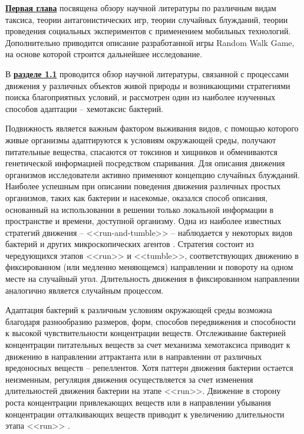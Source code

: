 \underline{\textbf{Первая глава}} посвящена обзору научной литературы по различным видам таксиса, теории антагонистических игр, теории случайных блужданий, теории проведения социальных экспериментов с применением мобильных технологий. Дополнительно приводится описание разработанной игры Random Walk Game, на основе которой строится дальнейшее исследование.

В \underline{\textbf{разделе 1.1}} проводится обзор научной литературы, связанной с процессами движения у различных объектов живой природы и возникающими стратегиями поиска благоприятных условий, и рассмотрен один из наиболее изученных способов адаптации -- хемотаксис бактерий. 

Подвижность является важным фактором выживания видов, с помощью которого живые организмы адаптируются к условиям окружающей среды, получают питательные вещества, спасаются от токсинов и хищников и обмениваются генетической информацией посредством спаривания. Для описания движения организмов исследователи активно применяют концепцию случайных блужданий. Наиболее успешным при описании поведения движения различных простых организмов, таких как бактерии и насекомые, оказался способ описания, основанный на использовании в решении только локальной информации в пространстве и времени, доступной организму. Одна из наиболее известных стратегий движения -- <<run-and-tumble>> -- наблюдается у некоторых видов бактерий и других микроскопических агентов \cite{berg_coli_2004}. Стратегия состоит из чередующихся этапов <<run>> и <<tumble>>, соответствующих движению в фиксированном (или медленно меняющемся) направлении и повороту на одном месте на случайный угол. Длительность движения в фиксированном направлении аналогично является случайным процессом.

Адаптация бактерий к различным условиям окружающей среды возможна благодаря разнообразию размеров, форм, способов передвижения и способности к высокой чувствительности концентрации веществ. Отслеживание бактерией концентрации питательных веществ за счет механизма хемотаксиса приводит к движению в направлении аттрактанта или в направлении от различных вредоносных веществ -- репеллентов. Хотя паттерн движения бактерии остается неизменным, регуляция движения осуществляется за счет изменения длительностей движения бактерии на этапе <<run>>. Движение в сторону роста концентрации привлекающих веществ или в направлении убывания концентрации отталкивающих веществ приводит к увеличению длительности этапа <<run>> \cite{berg_chemotaxis_1972}.

